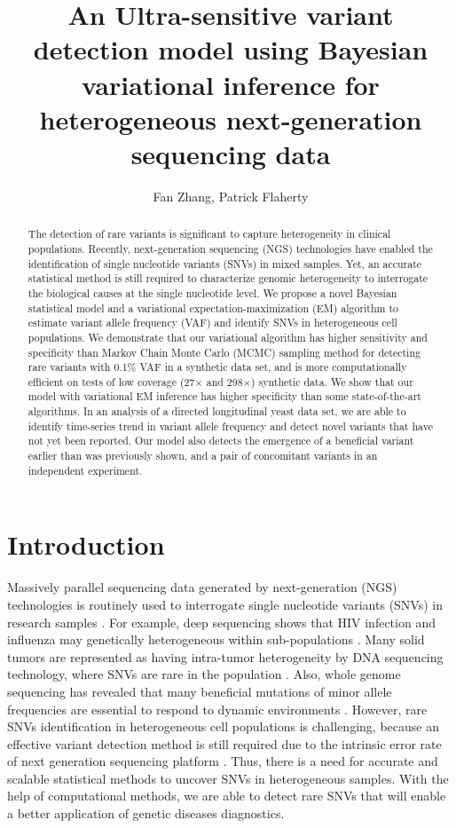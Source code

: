 \documentclass[11pt,reqno]{amsart}
\title[]{An Ultra-sensitive variant detection model using Bayesian variational inference for heterogeneous next-generation sequencing data}
\author{Fan Zhang, Patrick Flaherty}
\begin{document}
\maketitle

\begin{abstract}
The detection of rare variants is significant to capture heterogeneity in clinical populations.
Recently, next-generation sequencing (NGS) technologies have enabled the identification of single nucleotide variants (SNVs) in mixed samples.
Yet, an accurate statistical method is still required to characterize genomic heterogeneity to interrogate the biological causes at the single nucleotide level.
We propose a novel Bayesian statistical model and a variational expectation-maximization (EM) algorithm to estimate variant allele frequency (VAF) and identify SNVs in heterogeneous cell populations.
We demonstrate that our variational algorithm has higher sensitivity and specificity than Markov Chain Monte Carlo (MCMC) sampling method for detecting rare variants with 0.1\% VAF in a synthetic data set,
and is more computationally efficient on tests of low coverage (27$\times$ and 298$\times$) synthetic data.
We show that our model with variational EM inference has higher specificity than some state-of-the-art algorithms.
In an analysis of a directed longitudinal yeast data set, we are able to identify time-series trend in variant allele frequency and detect novel variants that have not yet been reported.
Our model also detects the emergence of a beneficial variant earlier than was previously shown, and a pair of concomitant variants in an independent experiment.
\end{abstract}

\section{Introduction}
Massively parallel sequencing data generated by next-generation (NGS) technologies is routinely used to interrogate single nucleotide variants (SNVs) in research samples \citep{koboldt2013next}.
For example, deep sequencing shows that HIV infection and influenza may genetically heterogeneous within sub-populations \citep{flaherty2011ultrasensitive}.
Many solid tumors are represented as having intra-tumor heterogeneity by DNA sequencing technology, where SNVs are rare in the population \citep{navin2010inferring}.
Also, whole genome sequencing has revealed that many beneficial mutations of minor allele frequencies are essential to respond to dynamic environments \citep{kvitek2013whole}.
However, rare SNVs identification in heterogeneous cell populations is challenging, because an effective variant detection method is still required due to the intrinsic error rate of next generation sequencing platform \citep{shendure2008next}.
Thus, there is a need for accurate and scalable statistical methods to uncover SNVs in heterogeneous samples.
With the help of computational methods, we are able to detect rare SNVs that will enable a better application of genetic diseases diagnostics.
\end{document}
